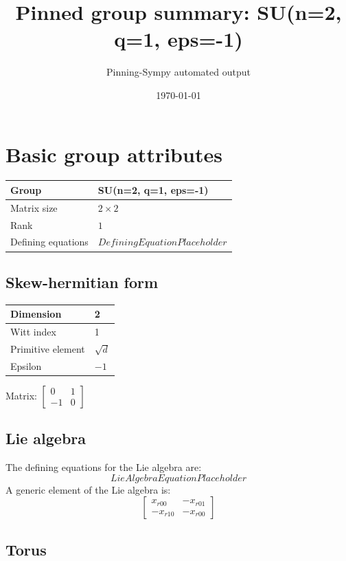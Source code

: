 \documentclass[11pt]{article}
\title{Pinned group summary: SU(n=2, q=1, eps=-1)}
\author{Pinning-Sympy automated output}
\date{\today}
\theoremstyle{definition}
\begin{document}
\maketitle
\tableofcontents

\newpage

\section{Basic group attributes}

\begin{tabular}{|l|l|}
	\hline
    Group & SU(n=2, q=1, eps=-1) \\
	\hline
    Matrix size & $2 \times 2$ \\
	\hline
    Rank & $1$ \\
	\hline
	Defining equations & $DefiningEquationPlaceholder$ \\
	\hline
\end{tabular}

\subsection{Skew-hermitian form}
\begin{tabular}{|l|l|}
    \hline
    Dimension & 2 \\
    \hline
    Witt index & 1 \\
    \hline
    Primitive element & $\sqrt{d}$ \\
    \hline
    Epsilon & $-1$ \\
    \hline
\end{tabular}

\bigskip
\noindent Matrix: \(
\left[\begin{matrix}0 & 1\\-1 & 0\end{matrix}\right]
\)



\subsection{Lie algebra}

The defining equations for the Lie algebra are:
\[
LieAlgebraEquationPlaceholder
\]
A generic element of the Lie algebra is:
\[
\left[\begin{matrix}x_{r 0 0} & - x_{r 0 1}\\- x_{r 1 0} & - x_{r 0 0}\end{matrix}\right]
\]

\subsection{Torus}
\end{document}
